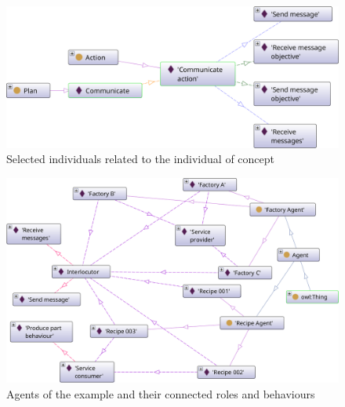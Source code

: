 \begin{figure}
    \centering
    \includegraphics[width=\linewidth]{Deliverables/Phase 1/Figures/Example Communicate plan.png}
    \caption{Selected individuals related to the  individual of concept }
    \label{fig: Example Communicate plan}
\end{figure}

\begin{figure}
    \centering
    \includegraphics[width=\linewidth]{Deliverables/Phase 1/Figures/Example agents and roles.png}
    \caption{Agents of the example and their connected roles and behaviours}
    \label{fig: Example agents and roles}
\end{figure}

